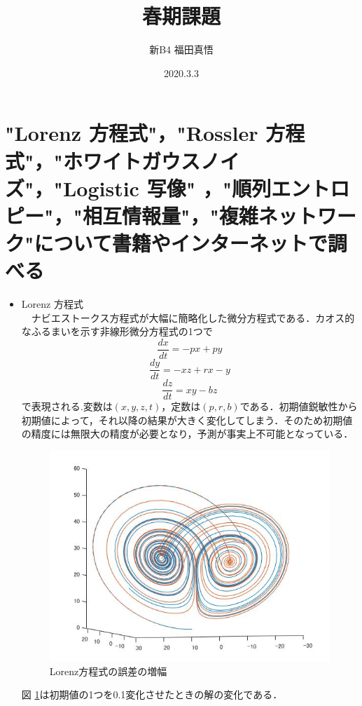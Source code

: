 \documentclass[autodetect-engine,dvipdfmx-if-dvi,ja=standard,a4paper,11pt]{bxjsarticle} %
\title{春期課題} %
\author{新B4 福田真悟} %
\date{2020.3.3}%
\begin{document}
\maketitle %
\section{\normalsize"Lorenz 方程式"，"Rossler 方程式"，"ホワイトガウスノイズ"，"Logistic 写像"
，"順列エントロピー"，"相互情報量"，"複雑ネットワーク"について書籍やインターネットで調べる
}%


\begin{itemize}
\item Lorenz 方程式\\%
　ナビエストークス方程式が大幅に簡略化した微分方程式である．カオス的なふるまいを示す非線形微分方程式の1つで
\begin{equation}
\frac{dx}{dt}=-px+py
\end{equation}
\begin{equation}
\frac{dy}{dt}=-xz+rx-y
\end{equation}
\begin{equation}
\frac{dz}{dt}=xy-bz
\end{equation}
で表現される\cite{lo}.変数は$(x,y,z,t)$，定数は$(p,r,b)$である．初期値鋭敏性から初期値によって，それ以降の結果が大きく変化してしまう．そのため初期値の精度には無限大の精度が必要となり，予測が事実上不可能となっている．

\begin{figure}[H]%
\begin{center}

\includegraphics[width=.4\textwidth]{Lorenz_result.jpg}
\end{center}
\caption{Lorenz方程式の誤差の増幅}%
\label{fig:lorenz}
\end{figure}

図 \ref{fig:lorenz}は初期値の1つを0.1変化させたときの解の変化である．\\


\end{itemize}
\end{document}
